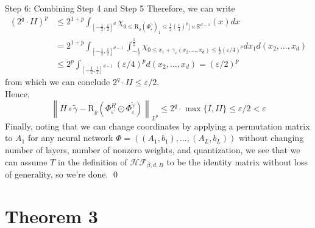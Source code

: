 \documentclass{if-beamer}
\newcommand{\norm}[2]{\left\lVert#1\right\rVert_{#2}}
\begin{document}
\begin{frame}{Step 6: Combining Step 4 and Step 5}
    Therefore, we can write
    {\small
    \begin{align*}
        (2^q \cdot II)^p &\leq 2^{1+p} \int_{[-\frac{1}{2},\frac{1}{2}]^{d}} \chi_{0\leq \mathrm{R}_{\varrho}(\Phi_{\varepsilon}^{\widetilde{\gamma}})_1 \leq \frac{1}{2}(\frac{\varepsilon}{4})^p] \times \mathbb{R}^{d-1}}(x)dx\\
        &= 2^{1+p} \int_{[-\frac{1}{2},\frac{1}{2}]^{d-1}} \int_{-\frac{1}{2}}^{\frac{1}{2}} \chi_{0\leq x_1+\gamma_{\varepsilon}(x_2,\dots,x_d)\leq \frac{1}{2}(\varepsilon/4)^p} dx_1 d(x_2,\dots,x_d)\\
        &\leq 2^p \int_{[-\frac{1}{2},\frac{1}{2}]^{d-1}}(\varepsilon/4)^p d(x_2,\dots,x_d) = (\varepsilon/2)^p
    \end{align*}
    }%
    from which we can conclude $2^q \cdot II \leq \varepsilon/2$.\\
    Hence,
    {\small
    $$ \norm{H \circ \widetilde{\gamma} - \mathrm{R}_{\varrho}(\Phi_{\varepsilon'}^H \odot \Phi_{\varepsilon}^{\widetilde{\gamma}})}{L^p} \leq 2^q \cdot \max\{I, II\} \leq \varepsilon/2 < \varepsilon$$
    }%
    Finally, noting that we can change coordinates by applying a permutation matrix to $A_1$ for any neural network $\Phi = ((A_1,b_1), \dots, (A_L,b_L))$ without changing number of layers, number of nonzero weights, and quantization, we see that we can assume $T$ in the definition of $\mathcal{HF}_{\beta,d,B}$ to be the identity matrix without loss of generality, so we're done. \qed 
\end{frame}

\section{Theorem 3}
\end{document}
